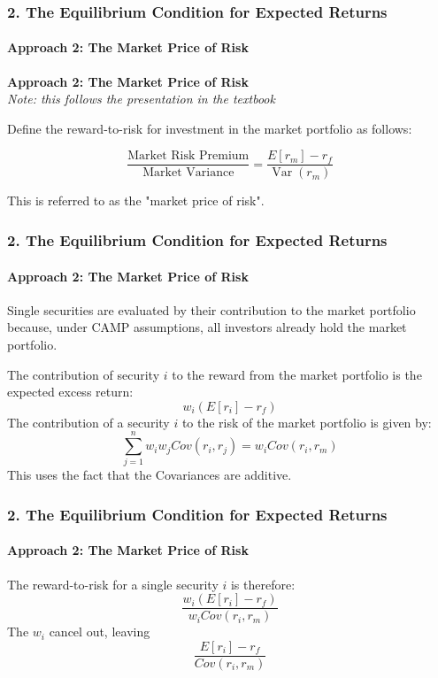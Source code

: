 \documentclass{beamer}
\begin{document}
\begin{frame}[t]
    \frametitle{2. The Equilibrium Condition for Expected Returns}
    \framesubtitle{Approach 2: The Market Price of Risk}

    \textbf{Approach 2: The Market Price of Risk}\\
    \textit{Note: this follows the presentation in the textbook}\\
    \vspace{1em}

    Define the reward-to-risk for investment in the market portfolio as follows:

    $$\frac{\text{Market Risk Premium}}{\text{Market Variance}} = \frac{E[r_m]-r_f}{\operatorname{Var}(r_m)}$$

    This is referred to as the "market price of risk".
  
    \vspace{1em}
    \vspace{1em} 

\end{frame}

\begin{frame}[t]
    \frametitle{2. The Equilibrium Condition for Expected Returns}
    \framesubtitle{Approach 2: The Market Price of Risk}

    Single securities are evaluated by their contribution to the market portfolio because, under CAMP assumptions,  all investors already hold the market portfolio.\\
    \vspace{1em}

    The contribution of security $i$ to the reward from the market portfolio is the expected excess return:
    $$w_i(E[r_i] - r_f)$$
    The  contribution of a security $i$ to the risk of the market portfolio is given by:
    $$\sum_{j=1}^{n}w_i w_jCov(r_i,r_j) = w_{i}Cov(r_i,r_m)$$
    This uses the fact that the Covariances are additive.
\end{frame}

\begin{frame}[t]
    \frametitle{2. The Equilibrium Condition for Expected Returns}
    \framesubtitle{Approach 2: The Market Price of Risk}

    The reward-to-risk for a single security $i$ is therefore:
     $$\frac{w_i(E[r_i] - r_f)}{ w_{i}Cov(r_i,r_m)}$$
     The $w_i$ cancel out, leaving
    $$\frac{E[r_i] - r_f}{Cov(r_i,r_m)}$$

\end{frame}
\end{document}
